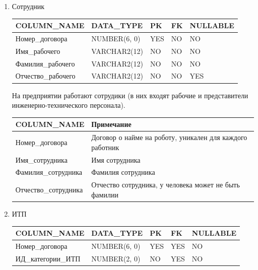 \begin{enumerate}
    \item{Сотрудник}

    \begin{tabular}{|p{4cm}|p{3cm}|p{1cm}|p{1cm}|p{2cm}|} \hline

        {\bf COLUMN\_NAME} & {\bf DATA\_TYPE} & {\bf PK} & {\bf FK} & {\bf NULLABLE} \\ \hline
        Номер\_договора & NUMBER(6, 0) & YES & NO & NO \\ \hline
        Имя\_рабочего & VARCHAR2(12) & NO & NO & NO \\ \hline
        Фамилия\_рабочего & VARCHAR2(12) & NO & NO & NO \\ \hline
        Отчество\_рабочего & VARCHAR2(12) & NO & NO & YES \\ \hline

    \end{tabular}

    На предприятии работают сотрудики (в них входят рабочие и представители инженерно-технического персонала).

    \begin{tabular}{|p{4cm}|p{5cm}|} \hline

        {\bf COLUMN\_NAME} & {\bf Примечание} \\ \hline
        Номер\_договора &  Договор о найме на роботу, уникален для каждого работник \\ \hline
        Имя\_сотрудника &  Имя сотрудника \\ \hline
        Фамилия\_сотрудника & Фамилия сотрудника \\ \hline
        Отчество\_сотрудника & Отчество сотрудника, у человека может не быть фамилии \\ \hline

    \end{tabular}

    \item{ИТП}

    \begin{tabular}{|p{4cm}|p{3cm}|p{1cm}|p{1cm}|p{2cm}|} \hline

        {\bf COLUMN\_NAME} & {\bf DATA\_TYPE} & {\bf PK} & {\bf FK} & {\bf NULLABLE} \\ \hline
        Номер\_договора & NUMBER(6, 0) & YES & YES & NO \\ \hline
        ИД\_категории\_ИТП & NUMBER(2, 0) & NO & YES & NO \\ \hline


\end{tabular}
\end{enumerate}

